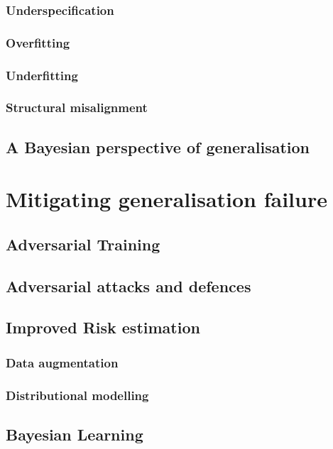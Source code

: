 		\subsubsection{Underspecification}
		\subsubsection{Overfitting}
		\subsubsection{Underfitting}
		\subsubsection{Structural misalignment}
		
		\subsection{A Bayesian perspective of generalisation}
\section{Mitigating generalisation failure}
	\subsection{Adversarial Training}
		\subsection{Adversarial attacks and defences}
	\subsection{Improved Risk estimation}
		\subsubsection{Data augmentation}
		\subsubsection{Distributional modelling}
	\subsection{Bayesian Learning}
	